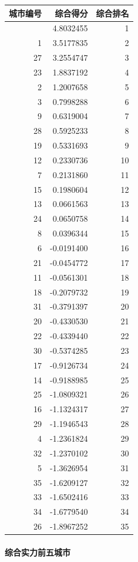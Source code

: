 \documentclass[
]{article}
\begin{document}
\begin{longtable}[]{@{}rrr@{}}
\toprule\noalign{}
城市编号 & 综合得分 & 综合排名 \\
\midrule\noalign{}
\endhead
\bottomrule\noalign{}
\endlastfoot
10 & 4.8032455 & 1 \\
1 & 3.5177835 & 2 \\
27 & 3.2554747 & 3 \\
23 & 1.8837192 & 4 \\
2 & 1.2007658 & 5 \\
3 & 0.7998288 & 6 \\
9 & 0.6319004 & 7 \\
28 & 0.5925233 & 8 \\
19 & 0.5331693 & 9 \\
12 & 0.2330736 & 10 \\
7 & 0.2131860 & 11 \\
15 & 0.1980604 & 12 \\
13 & 0.0661563 & 13 \\
24 & 0.0650758 & 14 \\
8 & 0.0396344 & 15 \\
6 & -0.0191400 & 16 \\
21 & -0.0454772 & 17 \\
11 & -0.0561301 & 18 \\
18 & -0.2079732 & 19 \\
31 & -0.3791397 & 20 \\
20 & -0.4330530 & 21 \\
22 & -0.4339440 & 22 \\
30 & -0.5374285 & 23 \\
17 & -0.9126734 & 24 \\
14 & -0.9188985 & 25 \\
25 & -1.0809321 & 26 \\
16 & -1.1324317 & 27 \\
29 & -1.1946543 & 28 \\
4 & -1.2361824 & 29 \\
32 & -1.2370102 & 30 \\
5 & -1.3626954 & 31 \\
35 & -1.6209127 & 32 \\
33 & -1.6502416 & 33 \\
34 & -1.6779540 & 34 \\
26 & -1.8967252 & 35 \\
\end{longtable}

\paragraph{综合实力前五城市}\label{ux7efcux5408ux5b9eux529bux524dux4e94ux57ceux5e02}
\end{document}
